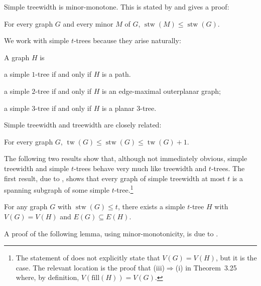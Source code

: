 \documentclass[kpfonts]{patmorin}
\DeclareMathOperator{\tw}{tw}
\DeclareMathOperator{\stw}{stw}
\theoremstyle{named}
\begin{document}
Simple treewidth is minor-monotone. This is stated by \citet{knauer.ueckerdt:simple} and \citet[Theorem~5.2]{wulf:stacked} gives a proof:

\begin{lem}\label{simple-minor-closed}
    For every graph $G$ and every minor $M$ of $G$, $\stw(M)\le\stw(G)$.
\end{lem}

We work with simple $t$-trees because they arise naturally:

\begin{lem}\label{simple-small-cases}
    A graph $H$ is
    \begin{compactenum}[(i)]
        \item a simple $1$-tree if and only if $H$ is a path.
        \item a simple $2$-tree if and only if $H$ is an edge-maximal outerplanar graph;
        \item a simple $3$-tree if and only if $H$ is a planar 3-tree.
    \end{compactenum}
\end{lem}

Simple treewidth and treewidth are closely related:

\begin{lem}\label{simple-treewidth-vs-treewidth}
    For every graph $G$, $\tw(G)\le \stw(G)\le \tw(G)+1$.
\end{lem}

The following two results show that, although not immediately obvious, simple treewidth and simple $t$-trees behave very much like treewidth and $t$-trees.  The first result, due to \citet[Theorem~3.27]{wulf:stacked}, shows that every graph of simple treewidth at most $t$ is a spanning subgraph of some simple $t$-tree.\footnote{The statement of \cite[Theorem~3.27]{wulf:stacked} does not explicitly state that $V(G)=V(H)$, but it is the case.  The relevant location is the proof that (iii)$\Rightarrow$(i) in Theorem~3.25 where, by definition, $V(\mathrm{fill}(H))=V(G)$.}

\begin{lem}\label{simple-subgraph}
    For any graph $G$ with $\stw(G)\le t$, there exists a simple $t$-tree $H$ with $V(G)= V(H)$ and $E(G)\subseteq E(H)$.
\end{lem}

A proof of the following lemma, using minor-monotonicity, is due to \citet{wood:personal}.
\end{document}

